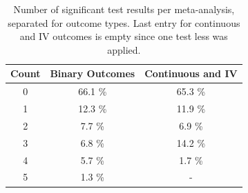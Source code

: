 \documentclass[11pt,a4paper,twoside]{book}\usepackage[]{graphicx}\usepackage[]{color}
\begin{document}
\begin{table}[ht]
\centering
\begingroup\footnotesize
\begin{tabular}{ccc}
  \hline
Count & Binary Outcomes & Continuous and IV \\ 
  \hline
0 & 66.1 \% & 65.3 \% \\ 
  1 & 12.3 \% & 11.9 \% \\ 
  2 & 7.7 \% & 6.9 \% \\ 
  3 & 6.8 \% & 14.2 \% \\ 
  4 & 5.7 \% & 1.7 \% \\ 
  5 & 1.3 \% & - \\ 
   \hline
\end{tabular}
\endgroup
\caption{Number of significant test results per meta-analysis, separated
       for outcome types. Last entry for continuous and IV outcomes is empty since one test less was 
       applied.} 
\label{number.sig.tests}
\end{table}
\end{document}
